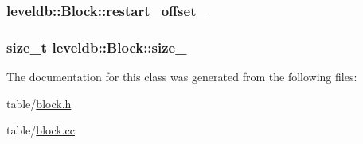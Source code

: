 \subsubsection[{restart\+\_\+offset\+\_\+}]{ leveldb\+::\+Block\+::restart\+\_\+offset\+\_\+\hspace{0.3cm}{\ttfamily [private]}}\label{classleveldb_1_1_block_aff5d8e7ec05b873104096fd2dce60a59}
\hypertarget{classleveldb_1_1_block_a7259478dd4f8989fe791a2b7e9b322fa}{}
\subsubsection[{size\+\_\+}]{\setlength{\rightskip}{0pt plus 5cm}size\+\_\+t leveldb\+::\+Block\+::size\+\_\+\hspace{0.3cm}{\ttfamily [private]}}\label{classleveldb_1_1_block_a7259478dd4f8989fe791a2b7e9b322fa}


The documentation for this class was generated from the following files\+:\begin{DoxyCompactItemize}
\item 
table/\hyperlink{block_8h}{block.\+h}\item 
table/\hyperlink{block_8cc}{block.\+cc}\end{DoxyCompactItemize}

